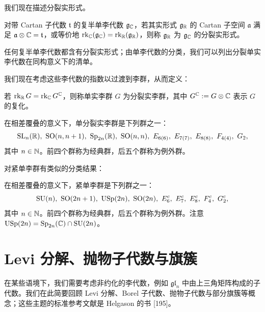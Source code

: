 我们现在描述分裂实形式。

\begin{definition}[A.25] 对带 Cartan 子代数 $\mathfrak{t}$ 的复半单李代数 $\mathfrak{g}_{\mathbb{C}}$，若其实形式 $\mathfrak{g}_{\mathbb{R}}$ 的 Cartan 子空间 $\mathfrak{a}$ 满足 $\mathfrak{a}\otimes\mathbb{C}=\mathfrak{t}$，或等价地 $\operatorname{rk}_{\mathbb{C}}(\mathfrak{g}_{\mathbb{C}})=\operatorname{rk}_{\mathbb{R}}(\mathfrak{g}_{\mathbb{R}})$，则称 $\mathfrak{g}_{\mathbb{R}}$ 为 $\mathfrak{g}_{\mathbb{C}}$ 的分裂实形式。
\end{definition}

任何复半单李代数都含有分裂实形式；由单李代数的分类，我们可以列出分裂单实李代数在同构意义下的清单。

我们现在考虑这些李代数的指数以过渡到李群，从而定义：

\begin{definition}[A.26] 若 $\operatorname{rk}_{\mathbb{R}} G=\operatorname{rk}_{\mathbb{C}} G^{\mathbb{C}}$，则称单实李群 $G$ 为分裂实李群，其中 $G^{\mathbb{C}}:=G\otimes\mathbb{C}$ 表示 $G$ 的复化。
\end{definition}

\begin{fact}[A.27] 在相差覆叠的意义下，单分裂实李群是下列群之一：
\[
\SL_n(\R),\ \SO(n,n+1),\ \mathrm{Sp}_{2n}(\R),\ \SO(n,n),\ E_{6(6)},\ E_{7(7)},\ E_{8(8)},\ F_{4(4)},\ G_2,
\]
其中 $n\in\mathbb{N}$。前四个群称为经典群，后五个群称为例外群。
\end{fact}

对紧单李群有类似的分类结果：

\begin{fact}[A.28] 在相差覆叠的意义下，紧单李群是下列群之一：
\[
\SU(n),\ \SO(2n+1),\ \mathrm{USp}(2n),\ \SO(2n),\ E_6^c,\ E_7^c,\ E_8^c,\ F_4^c,\ G_2^c,
\]
其中 $n\in\mathbb{N}$。前四个群称为经典群，后五个群称为例外群。注意 $\mathrm{USp}(2n)=\mathrm{Sp}_{2n}(\mathbb{C})\cap\operatorname{SU}(2n)$。
\end{fact}


\section{Levi 分解、抛物子代数与旗簇}

在某些语境下，我们需要考虑非约化的李代数，例如 $\mathfrak{gl}_n$ 中由上三角矩阵构成的子代数。我们在此简要回顾 Levi 分解、Borel 子代数、抛物子代数与部分旗簇等概念；这些主题的标准参考文献是 Helgason 的书 [195]。

